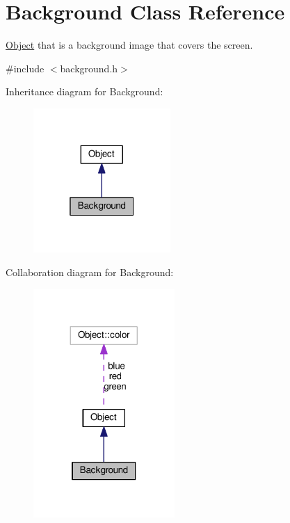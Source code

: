 \hypertarget{classBackground}{}\section{Background Class Reference}
\label{classBackground}


\hyperlink{classObject}{Object} that is a background image that covers the screen.  




{\ttfamily \#include $<$background.\+h$>$}



Inheritance diagram for Background\+:\nopagebreak
\begin{figure}[H]
\begin{center}
\leavevmode
\includegraphics[width=148pt]{classBackground__inherit__graph}
\end{center}
\end{figure}


Collaboration diagram for Background\+:
\nopagebreak
\begin{figure}[H]
\begin{center}
\leavevmode
\includegraphics[width=152pt]{classBackground__coll__graph}
\end{center}
\end{figure}
